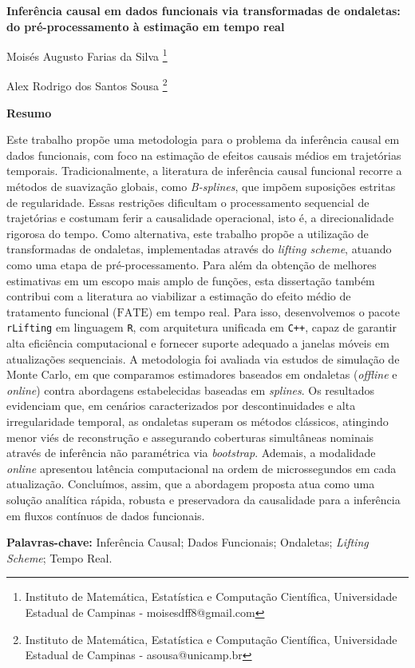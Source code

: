 \documentclass[a4paper,11pt]{article}
\begin{document}
\begin{center}
\Large{\textbf{Inferência causal em dados funcionais via transformadas de ondaletas: do pré-processamento à estimação em tempo real}}
\end{center}

\begin{center}
    Moisés Augusto Farias da Silva
    \footnote[1]{Instituto de Matemática, Estatística e Computação Científica, Universidade Estadual de Campinas - moisesdff8@gmail.com}

    Alex Rodrigo dos Santos Sousa
    \footnote[2]{Instituto de Matemática, Estatística e Computação Científica, Universidade Estadual de Campinas - asousa@unicamp.br}

    \vspace{0.5cm}
    \large{\textbf{Resumo}}
\end{center}

Este trabalho propõe uma metodologia para o problema da inferência causal em dados funcionais, com foco na estimação de efeitos causais médios em trajetórias temporais. Tradicionalmente, a literatura de inferência causal funcional recorre a métodos de suavização globais, como \emph{B-splines}, que impõem suposições estritas de regularidade. Essas restrições dificultam o processamento sequencial de trajetórias e costumam ferir a causalidade operacional, isto é, a direcionalidade rigorosa do tempo. Como alternativa, este trabalho propõe a utilização de transformadas de ondaletas, implementadas através do \emph{lifting scheme}, atuando como uma etapa de pré-processamento. Para além da obtenção de melhores estimativas em um escopo mais amplo de funções, esta dissertação também contribui com a literatura ao viabilizar a estimação do efeito médio de tratamento funcional (\(\mathrm{FATE}\)) em tempo real. Para isso, desenvolvemos o pacote \texttt{rLifting} em linguagem \texttt{R}, com arquitetura unificada em \texttt{C++}, capaz de garantir alta eficiência computacional e fornecer suporte adequado a janelas móveis em atualizações sequenciais. A metodologia foi avaliada via estudos de simulação de Monte Carlo, em que comparamos estimadores baseados em ondaletas (\emph{offline} e \emph{online}) contra abordagens estabelecidas baseadas em \emph{splines}. Os resultados evidenciam que, em cenários caracterizados por descontinuidades e alta irregularidade temporal, as ondaletas superam os métodos clássicos, atingindo menor viés de reconstrução e assegurando coberturas simultâneas nominais através de inferência não paramétrica via \emph{bootstrap}. Ademais, a modalidade \emph{online} apresentou latência computacional na ordem de microssegundos em cada atualização. Concluímos, assim, que a abordagem proposta atua como uma solução analítica rápida, robusta e preservadora da causalidade para a inferência em fluxos contínuos de dados funcionais.

\vspace{0.5cm}
\textbf{Palavras-chave:} Inferência Causal; Dados Funcionais; Ondaletas; \textit{Lifting Scheme}; Tempo Real.
\end{document}
